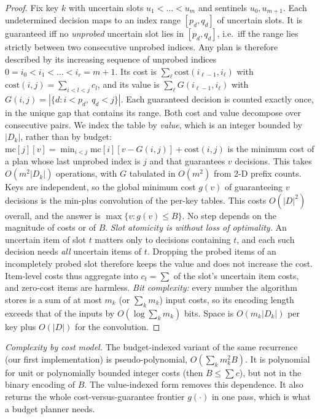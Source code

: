 \documentclass[conference]{IEEEtran}
\begin{document}
\begin{proof}
Fix key $k$ with uncertain slots $u_1<\dots<u_m$ and sentinels $u_0,u_{m+1}$. Each undetermined decision maps to an
index range $[p_d,q_d]$ of uncertain slots. It is guaranteed iff no \emph{unprobed} uncertain slot lies in
$[p_d,q_d]$, i.e.\ iff the range lies strictly between two consecutive unprobed indices. Any plan is therefore
described by its increasing sequence of unprobed indices $0=i_0<i_1<\dots<i_r=m+1$. Its cost is
$\sum_{\ell}\mathrm{cost}(i_{\ell-1},i_\ell)$ with $\mathrm{cost}(i,j)=\sum_{i<l<j}c_l$, and its value is
$\sum_\ell G(i_{\ell-1},i_\ell)$ with $G(i,j)=|\{d: i<p_d,\ q_d<j\}|$. Each guaranteed decision is counted exactly once,
in the unique gap that contains its range. Both cost and value decompose over consecutive pairs. We index the table by \emph{value}, which is an integer
bounded by $|D_k|$, rather than by budget:
$\mathrm{mc}[j][v]=\min_{i<j}\mathrm{mc}[i][v-G(i,j)]+\mathrm{cost}(i,j)$ is the minimum cost of a plan whose last
unprobed index is $j$ and that guarantees $v$ decisions. This takes $O(m^2|D_k|)$ operations, with $G$ tabulated in
$O(m^2)$ from 2-D prefix counts. Keys are independent, so the global minimum cost $g(v)$ of guaranteeing $v$ decisions is
the min-plus convolution of the per-key tables. This costs $O(|D|^2)$ overall, and the answer is $\max\{v: g(v)\le B\}$.
No step depends on the magnitude of costs or of $B$.
\emph{Slot atomicity is without loss of optimality.} An uncertain item of slot $t$ matters only to decisions
containing $t$, and each such decision needs \emph{all} uncertain items of $t$. Dropping the probed items of an
incompletely probed slot therefore keeps the value and does not increase the cost. Item-level costs thus aggregate into
$c_t=\sum$ of the slot's uncertain item costs, and zero-cost items are harmless. \emph{Bit complexity:} every number
the algorithm stores is a sum of at most $m_k$ (or $\sum_k m_k$) input costs, so its encoding length exceeds that of
the inputs by $O(\log\sum_k m_k)$ bits. Space is $O(m_k|D_k|)$ per key plus $O(|D|)$ for the convolution.
\end{proof}
\emph{Complexity by cost model.} The budget-indexed variant of the same recurrence (our first implementation) is
pseudo-polynomial, $O(\sum_k m_k^2B)$. It is polynomial for unit or polynomially bounded integer costs (then
$B\le\sum c$), but not in the binary encoding of $B$. The value-indexed form removes this dependence. It also returns
the whole cost-versus-guarantee frontier $g(\cdot)$ in one pass, which is what a budget planner needs.
\end{document}

